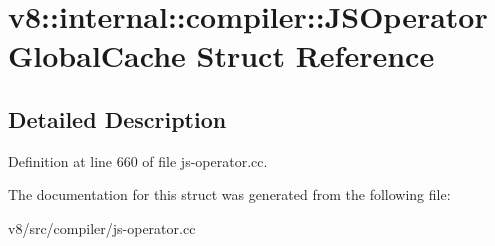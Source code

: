 \hypertarget{structv8_1_1internal_1_1compiler_1_1JSOperatorGlobalCache}{}\section{v8\+:\+:internal\+:\+:compiler\+:\+:J\+S\+Operator\+Global\+Cache Struct Reference}
\label{structv8_1_1internal_1_1compiler_1_1JSOperatorGlobalCache}


\subsection{Detailed Description}


Definition at line 660 of file js-\/operator.\+cc.



The documentation for this struct was generated from the following file\+:\begin{DoxyCompactItemize}
\item 
v8/src/compiler/js-\/operator.\+cc\end{DoxyCompactItemize}
